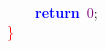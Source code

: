 \mbox{} \\
\mbox{}\ \ \ \ \textbf{\textcolor{Blue}{return}}\ \textcolor{Purple}{0}\textcolor{BrickRed}{;}\  \\
\mbox{}\textcolor{Red}{\}} \\
\mbox{}\ \ \ \  \\
\mbox{} \\
\mbox{} \\
\mbox{} \\
\mbox{} \\
\mbox{} \\
\mbox{} \\
\mbox{} \\
\mbox{} \\
\mbox{} \\
\mbox{}\ \ \ \ \ \ \ \ \ \ \ \  \\
\mbox{} \\
\mbox{}
